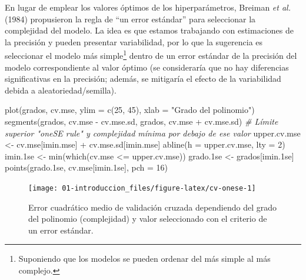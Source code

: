 \documentclass[
]{book}
\newenvironment{Shaded}{\begin{snugshade}}{\end{snugshade}}
\newcommand{\AttributeTok}[1]{\textcolor[rgb]{0.77,0.63,0.00}{#1}}
\newcommand{\CommentTok}[1]{\textcolor[rgb]{0.56,0.35,0.01}{\textit{#1}}}
\newcommand{\DecValTok}[1]{\textcolor[rgb]{0.00,0.00,0.81}{#1}}
\newcommand{\FloatTok}[1]{\textcolor[rgb]{0.00,0.00,0.81}{#1}}
\newcommand{\FunctionTok}[1]{\textcolor[rgb]{0.00,0.00,0.00}{#1}}
\newcommand{\NormalTok}[1]{#1}
\newcommand{\OtherTok}[1]{\textcolor[rgb]{0.56,0.35,0.01}{#1}}
\newcommand{\SpecialCharTok}[1]{\textcolor[rgb]{0.00,0.00,0.00}{#1}}
\newcommand{\StringTok}[1]{\textcolor[rgb]{0.31,0.60,0.02}{#1}}
\theoremstyle{break}
\theoremstyle{definition}
\theoremstyle{definition}
\theoremstyle{definition}
\theoremstyle{definition}
\theoremstyle{remark}
\begin{document}
En lugar de emplear los valores óptimos de los hiperparámetros, Breiman \emph{et al.} (1984) propusieron la regla de ``un error estándar'' para seleccionar la complejidad del modelo.
La idea es que estamos trabajando con estimaciones de la precisión y pueden presentar variabilidad,
por lo que la sugerencia es seleccionar el modelo más simple\footnote{Suponiendo que los modelos se pueden ordenar del más simple al más complejo.} dentro de un error estándar de la precisión del modelo correspondiente al valor óptimo
(se consideraría que no hay diferencias significativas en la precisión;
además, se mitigaría el efecto de la variabilidad debida a aleatoriedad/semilla).

\begin{Shaded}
\begin{Highlighting}[]
\FunctionTok{plot}\NormalTok{(grados, cv.mse, }\AttributeTok{ylim =} \FunctionTok{c}\NormalTok{(}\DecValTok{25}\NormalTok{, }\DecValTok{45}\NormalTok{),}
  \AttributeTok{xlab =} \StringTok{"Grado del polinomio"}\NormalTok{)}
\FunctionTok{segments}\NormalTok{(grados, cv.mse }\SpecialCharTok{{-}}\NormalTok{ cv.mse.sd, grados, cv.mse }\SpecialCharTok{+}\NormalTok{ cv.mse.sd)}
\CommentTok{\# Límite superior "oneSE rule" y complejidad mínima por debajo de ese valor}
\NormalTok{upper.cv.mse }\OtherTok{\textless{}{-}}\NormalTok{ cv.mse[imin.mse] }\SpecialCharTok{+}\NormalTok{ cv.mse.sd[imin.mse]}
\FunctionTok{abline}\NormalTok{(}\AttributeTok{h =}\NormalTok{ upper.cv.mse, }\AttributeTok{lty =} \DecValTok{2}\NormalTok{)}
\NormalTok{imin}\FloatTok{.1}\NormalTok{se }\OtherTok{\textless{}{-}} \FunctionTok{min}\NormalTok{(}\FunctionTok{which}\NormalTok{(cv.mse }\SpecialCharTok{\textless{}=}\NormalTok{ upper.cv.mse))}
\NormalTok{grado}\FloatTok{.1}\NormalTok{se }\OtherTok{\textless{}{-}}\NormalTok{ grados[imin}\FloatTok{.1}\NormalTok{se]}
\FunctionTok{points}\NormalTok{(grado}\FloatTok{.1}\NormalTok{se, cv.mse[imin}\FloatTok{.1}\NormalTok{se], }\AttributeTok{pch =} \DecValTok{16}\NormalTok{)}
\end{Highlighting}
\end{Shaded}

\begin{figure}[!htb]

{\centering \texttt{[image: 01-introduccion\_files/figure-latex/cv-onese-1]} 

}

\caption{Error cuadrático medio de validación cruzada dependiendo del grado del polinomio (complejidad) y valor seleccionado con el criterio de un error estándar.}\label{fig:cv-onese}
\end{figure}
\end{document}

